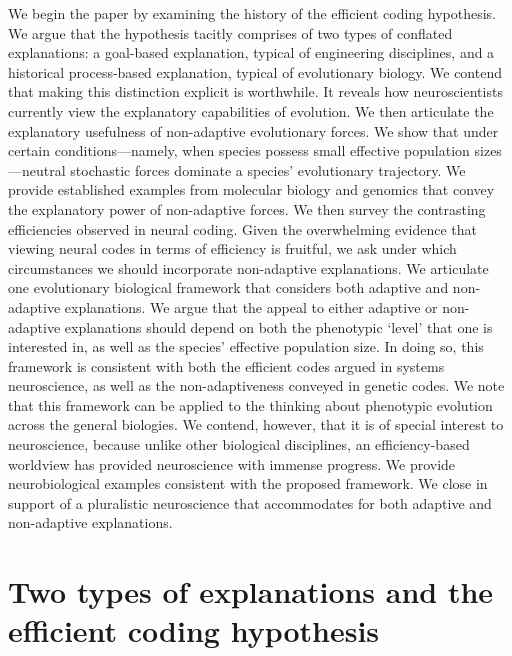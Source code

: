 \documentclass[twocolumn]{article}
\begin{document}
We begin the paper by examining the history of the efficient coding hypothesis. We argue that the hypothesis tacitly comprises of two types of conflated explanations: a goal-based explanation, typical of engineering disciplines, and a historical process-based explanation, typical of evolutionary biology. We contend that making this distinction explicit is worthwhile. It reveals how neuroscientists currently view the explanatory capabilities of evolution. We then articulate the explanatory usefulness of non-adaptive evolutionary forces. We show that under certain conditions---namely, when species possess small effective population sizes---neutral stochastic forces dominate a species' evolutionary trajectory. We provide established examples from molecular biology and genomics that convey the explanatory power of non-adaptive forces. We then survey the contrasting efficiencies observed in neural coding. Given the overwhelming evidence that viewing neural codes in terms of efficiency is fruitful, we ask under which circumstances we should incorporate non-adaptive explanations. We articulate one evolutionary biological framework that considers both adaptive and non-adaptive explanations. We argue that the appeal to either adaptive or non-adaptive explanations should depend on both the phenotypic `level' that one is interested in, as well as the species' effective population size. In doing so, this framework is consistent with both the efficient codes argued in systems neuroscience, as well as the non-adaptiveness conveyed in genetic codes. We note that this framework can be applied to the thinking about phenotypic evolution across the general biologies. We contend, however, that it is of special interest to neuroscience, because unlike other biological disciplines, an efficiency-based worldview has provided neuroscience with immense progress. We provide neurobiological examples consistent with the proposed framework. We close in support of a pluralistic neuroscience that accommodates for both adaptive and non-adaptive explanations. 


\section{Two types of explanations and the efficient coding hypothesis}

\end{document}
